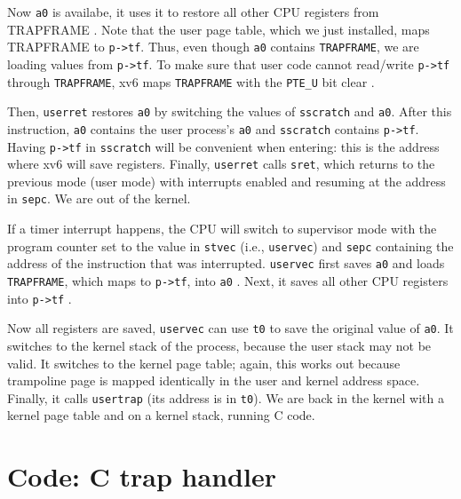 Now \lstinline{a0} is availabe, it uses it to restore all other CPU
registers from TRAPFRAME .
Note that the user page table, which we just installed, maps
TRAPFRAME to \lstinline{p->tf}.  Thus, even though \lstinline{a0}
contains \lstinline{TRAPFRAME}, we are loading values from
\lstinline{p->tf}.  To make sure that user code cannot read/write
\lstinline{p->tf} through \lstinline{TRAPFRAME}, xv6 maps
\lstinline{TRAPFRAME} with the \lstinline{PTE_U} bit clear
.

Then, \lstinline{userret} restores \lstinline{a0} by switching the
values of \lstinline{sscratch} and \lstinline{a0}. After this
instruction, \lstinline{a0} contains the user process's \lstinline{a0}
and \lstinline{sscratch} contains \lstinline{p->tf}.  Having
\lstinline{p->tf} in \lstinline{sscratch} will be convenient when
entering: this is the address where xv6 will save registers.  Finally,
\lstinline{userret} calls \lstinline{sret}, which returns to the
previous mode (user mode) with interrupts enabled and resuming at the
address in \lstinline{sepc}.  We are out of the kernel.

If a timer interrupt happens, the CPU will switch to supervisor mode with
the program counter set to the value in \lstinline{stvec} (i.e.,
\lstinline{uservec}) and \lstinline{sepc} containing the address of
the instruction that was interrupted.  \lstinline{uservec} first saves
\lstinline{a0} and loads \lstinline{TRAPFRAME}, which maps to
\lstinline{p->tf}, into \lstinline{a0}
.
Next, it saves all other
CPU registers into \lstinline{p->tf}
.

Now all registers are saved, \lstinline{uservec} can
use \lstinline{t0} to save the original value of \lstinline{a0}.  It
switches to the kernel stack of the process, because the user stack
may not be valid.  It switches to the kernel page table; again, this
works out because trampoline page is mapped identically in the user
and kernel address space.  Finally, it calls \lstinline{usertrap} (its
address is in \lstinline{t0}).  We are back in the kernel with a
kernel page table and on a kernel stack, running C code.

\section{Code: C trap handler}

